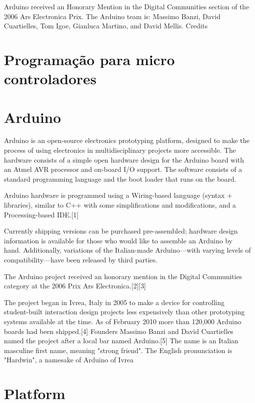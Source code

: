 Arduino received an Honorary Mention in the Digital Communities section of the 2006 Ars Electronica Prix. The Arduino team is: Massimo Banzi, David Cuartielles, Tom Igoe, Gianluca Martino, and David Mellis. Credits


\section{Programação para micro controladores}

\section{Arduino}


Arduino is an open-source electronics prototyping platform, designed to make the process of using electronics in multidisciplinary projects more accessible. The hardware consists of a simple open hardware design for the Arduino board with an Atmel AVR processor and on-board I/O support. The software consists of a standard programming language and the boot loader that runs on the board.

Arduino hardware is programmed using a Wiring-based language (syntax + libraries), similar to C++ with some simplifications and modifications, and a Processing-based IDE.[1]

Currently shipping versions can be purchased pre-assembled; hardware design information is available for those who would like to assemble an Arduino by hand. Additionally, variations of the Italian-made Arduino—with varying levels of compatibility—have been released by third parties.

The Arduino project received an honorary mention in the Digital Communities category at the 2006 Prix Ars Electronica.[2][3]

The project began in Ivrea, Italy in 2005 to make a device for controlling student-built interaction design projects less expensively than other prototyping systems available at the time. As of February 2010 more than 120,000 Arduino boards had been shipped.[4] Founders Massimo Banzi and David Cuartielles named the project after a local bar named Arduino.[5] The name is an Italian masculine first name, meaning "strong friend". The English pronunciation is "Hardwin", a namesake of Arduino of Ivrea

\section{Platform}

